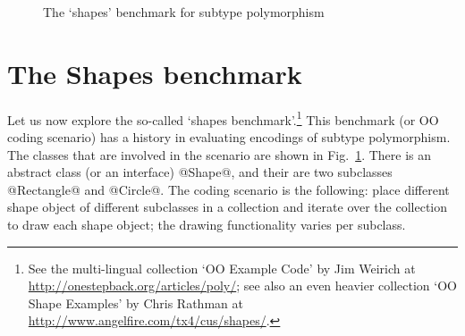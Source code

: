   


 

                                                                             
\begin{figure}[t]
\begin{center}
\end{center}
\vspace{-33\in}
\caption{The `shapes' benchmark for subtype polymorphism}
\label{F:shapes}
\end{figure}
                                                                             

 
 

 
\section{The Shapes benchmark}
\label{S:shapes}


Let us now explore the so-called `shapes benchmark'.\footnote{See the
multi-lingual collection `OO Example Code' by Jim Weirich at
\url{http://onestepback.org/articles/poly/}; see also an even heavier
collection `OO Shape Examples' by Chris Rathman at
\url{http://www.angelfire.com/tx4/cus/shapes/}.}  This benchmark (or
OO coding scenario) has a history in evaluating encodings of
subtype polymorphism. The classes that are involved in the
scenario are shown in Fig.~\ref{F:shapes}. There is an abstract class
(or an interface) @Shape@, and their are two subclasses @Rectangle@
and @Circle@. The coding scenario is the following: place different
shape object of different subclasses in a collection and iterate over
the collection to draw each shape object; the drawing
functionality varies per subclass.

